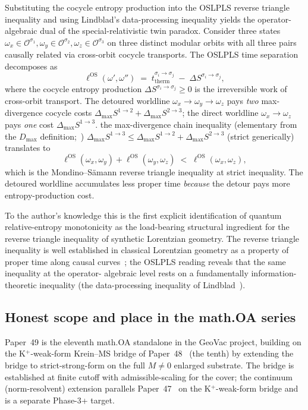 \documentclass[11pt,a4paper]{article}
\theoremstyle{plain}
\theoremstyle{definition}
\newcommand{\Ocal}{\mathcal{O}}
\newcommand{\ellOS}{\ell^{\mathrm{OS}}}
\newcommand{\Oorb}[1]{\Ocal^{\sigma_{#1}}}
\newcommand{\DelS}[2]{\Delta S^{\sigma_{#1}\to\sigma_{#2}}}
\begin{document}
Substituting the cocycle entropy production into the OSLPLS reverse
triangle inequality and using Lindblad's data-processing inequality
yields the operator-algebraic dual of the special-relativistic twin
paradox. Consider three states $\omega_{x}\in\Oorb{1},
\omega_{y}\in\Oorb{2},\omega_{z}\in\Oorb{3}$ on three distinct
modular orbits with all three pairs causally related via cross-orbit
cocycle transports. The OSLPLS time separation decomposes as
\[
  \ellOS(\omega',\omega'') \;=\; t_{\mathrm{therm}}^{\sigma_{i}\to\sigma_{j}} \;-\; \DelS{i}{j},
\]
where the cocycle entropy production
$\DelS{i}{j}\ge 0$ is the irreversible work of cross-orbit transport.
The detoured worldline $\omega_{x}\to\omega_{y}\to\omega_{z}$ pays
\emph{two} max-divergence cocycle costs
$\Delta_{\max}S^{1\to 2}+\Delta_{\max}S^{2\to 3}$; the
direct worldline $\omega_{x}\to\omega_{z}$ pays \emph{one} cost
$\Delta_{\max}S^{1\to 3}$. the max-divergence chain inequality (elementary from the $D_{\max}$ definition;\ \cite{datta2009})
$\Delta_{\max}S^{1\to 3}\le\Delta_{\max}S^{1\to 2}+\Delta_{\max}S^{2\to 3}$
(strict generically) translates to
\[
  \ellOS(\omega_{x},\omega_{y}) + \ellOS(\omega_{y},\omega_{z}) \;<\; \ellOS(\omega_{x},\omega_{z}),
\]
which is the Mondino--S\"amann reverse triangle inequality at strict
inequality. The detoured worldline accumulates less proper time
\emph{because} the detour pays more entropy-production cost.

To the author's knowledge this is the first explicit identification of
quantum relative-entropy monotonicity as the load-bearing structural
ingredient for the reverse triangle inequality of synthetic
Lorentzian geometry. The reverse triangle inequality is well
established in classical Lorentzian geometry as a property of proper
time along causal curves~\cite{kunzinger_samann2018,mondino_samann2025_pointed};
the OSLPLS reading reveals that the same inequality at the operator-
algebraic level rests on a fundamentally information-theoretic
inequality (the data-processing inequality of
Lindblad~\cite{lindblad1975}).

\subsection{Honest scope and place in the math.OA series}
\label{sec:honest_scope_intro}

Paper~49 is the eleventh math.OA standalone in the GeoVac project,
building on the K$^{+}$-weak-form Krein--MS bridge of
Paper~48~\cite{paper48} (the tenth) by extending the bridge to
strict-strong-form on the full $M\ne 0$ enlarged substrate. The
bridge is established at finite cutoff with admissible-scaling for
the cover; the continuum (norm-resolvent) extension parallels
Paper~47~\cite{paper47} on the K$^{+}$-weak-form bridge and is a
separate Phase-3+ target.
\end{document}
